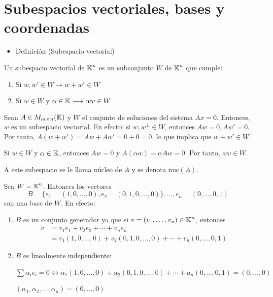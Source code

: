 \section{Subespacios vectoriales, bases y coordenadas}

\begin{itemize}[label=\color{red}\textbullet, leftmargin=*]
	\item \color{lightblue}Definición (Subespacio vectorial)
\end{itemize}

Un subespacio vectorial de $\operatorname{\mathbb{K}}^n$ es un subconjunto $W$ de $\operatorname{\mathbb{K}}^n$ que cumple:
\begin{enumerate}[label=\color{lightblue}\arabic*)]
	\item Si $w,w'\in W\longrightarrow w+w'\in W$
	\item Si $w\in W$ y $\alpha\in\operatorname{\mathbb{K}}\longrightarrow\alpha w\in W$
\end{enumerate}

\Ej

Sean $A\in M_{m\times n}(\operatorname{\mathbb{K}})$ y $W$ el conjunto de soluciones del sistema $Ax=0$. Entonces, $w$ es un subespacio vectorial. En efecto: si $w,w^\perp\in W$, entonces $Aw=0,Aw'=0$. Por tanto, $A(w+w')=Aw+Aw'=0+0=0$, lo que implica que $w+w'\in W$.

Si $w\in W$ y $\alpha\in\operatorname{\mathbb{K}}$, entonces $Aw=0$ y $A(\alpha w)=\alpha Aw=0$. Por tanto, $aw\in W$.

A este subespacio se le llama núcleo de $A$ y se denota $\mathrm{nuc}(A)$.


Sea $W=\operatorname{\mathbb{K}}^n$. Entonces los vectores \[ B=\{e_1=(1,0,\dots,0),e_2=(0,1,0,\dots,0)\},\dots,e_n=(0,\dots,0,1) \] son una base de $W$. En efecto:
\begin{enumerate}[label=\color{lightblue}\arabic*)]
	\item $B$ es un conjunto generador ya que si $v=(v_1,\dots,v_n)\in\operatorname{\mathbb{K}}^n$, entonces \begin{align*}
		v&=v_1e_1+v_2e_2+\cdots+v_ne_n\\
		&=v_1(1,0,\dots,0)+v_2(0,1,0,\dots,0)+\cdots+v_n(0,\dots,0,1)
	\end{align*}
	\item $B$ es linealmente independiente:
	
	$\sum\alpha_ie_i=0\longleftrightarrow\alpha_1(1,0,\dots,0)+\alpha_2(0,1,0,\dots,0)+\cdots+a_n(0,\dots,0,1)=(0,\dots,0)$
	
	$(\alpha_1,\alpha_2,\dots,\alpha_n)=(0,\dots,0)$
\end{enumerate}

